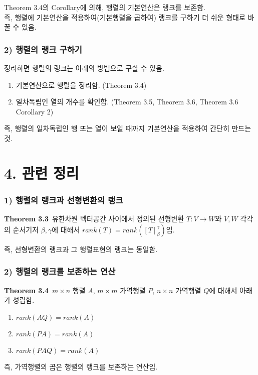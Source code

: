 Theorem 3.4의 Corollary에 의해, 행렬의 기본연산은 랭크를 보존함.\\
즉, 행렬에 기본연산을 적용하여(기본행렬을 곱하여) 랭크를 구하기 더 쉬운 형태로 바꿀 수 있음.

\subsubsection*{2) 행렬의 랭크 구하기}
정리하면 행렬의 랭크는 아래의 방법으로 구할 수 있음.
\begin{enumerate}
    \item 기본연산으로 행렬을 정리함. (Theorem 3.4)
    \item 일차독립인 열의 개수를 확인함. (Theorem 3.5, Theorem 3.6, Theorem 3.6 Corollary 2)
\end{enumerate}

즉, 행렬의 일차독립인 행 또는 열이 보일 때까지 기본연산을 적용하여 간단히 만드는 것.\\


\newpage


\section*{4. 관련 정리}
\subsubsection*{1) 행렬의 랭크과 선형변환의 랭크}
\textbf{Theorem 3.3}\, 유한차원 벡터공간 사이에서 정의된 선형변환 $T:V \rightarrow W$와 $V,W$ 각각의 순서기저 $\beta, \gamma$에 대해서 $rank(T)=rank([T]^{\gamma}_{\beta})$임.

즉, 선형변환의 랭크과 그 행렬표현의 랭크는 동일함.

\subsubsection*{2) 행렬의 랭크를 보존하는 연산}
\textbf{Theorem 3.4}\, $m \times n$ 행렬 $A$, $m \times m$ 가역행렬 $P$, $n \times n$ 가역행렬 $Q$에 대해서 아래가 성립함.

\begin{enumerate}
    \item $rank(AQ)=rank(A)$
    \item $rank(PA)=rank(A)$
    \item $rank(PAQ)=rank(A)$
\end{enumerate}

즉, 가역행렬의 곱은 행렬의 랭크를 보존하는 연산임.

